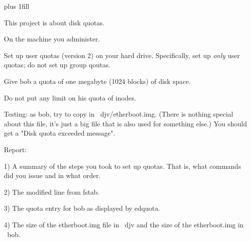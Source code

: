
\rightskip=0pt plus 1fill

\parindent 0pt

This project is about disk quotas.

On the machine you administer.

Set up user quotas (version 2) on your hard drive.
Specifically, set up {\it only} user quotas; do not set up group qoutas.

Give {\ltt{}bob} a quota of one megabyte (1024 blocks) of disk space.

Do not put any limit on his quota of inodes.

Testing: as {\ltt{}bob}, try to copy in {\ltt{}~djv/etherboot.img}.
(There is nothing special about this file, it's just a big file that
is also used for something else.)
You should get a "Disk quota exceeded message".

Report:

1) A summary of the steps you took to set up quotas.
That is, what commands did you issue and in what order.

2) The modified line from {\ltt{}fstab}.

3) The quota entry for {\ltt{}bob} as displayed by {\ltt{}edquota}.

4) The size of the {\ltt{}etherboot.img} file in {\ltt{}~djv} and
the size of the {\ltt{}etherboot.img} in {\ltt{}~bob}.

\bye

